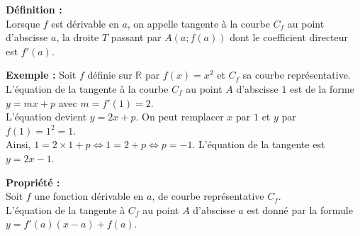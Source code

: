 \documentclass[11pt,a4paper]{article}
\begin{document}
\begin{mdframed}[style=definitionStyle]
    \textbf{Définition :} ~\\
    Lorsque $f$ est dérivable en $a$, on appelle tangente à la courbe $C_f$ au point d'abscisse $a$, la droite $T$ passant par $A(a;f(a))$ dont le coefficient directeur est $f'(a)$.
\end{mdframed}

\begin{minipage}{0.4\textwidth}
\end{minipage}
\hspace{0.05\textwidth}
\begin{minipage}{0.55\textwidth}
    \textbf{Exemple :} Soit $f$ définie sur $\mathbb{R}$ par $f(x)=x^2$ et $C_f$ sa courbe représentative. \\

    L'équation de la tangente à la courbe $C_f$ au point $A$ d'abscisse $1$ est de la forme $y=mx+p$ avec $m=f'(1)=2$. \\

    L'équation devient $y=2x+p$. On peut remplacer $x$ par $1$ et $y$ par $f(1)=1^2=1$. ~\\

    Ainsi, $1=2\times1+p\Leftrightarrow1=2+p\Leftrightarrow p=-1$.
    L'équation de la tangente est $y=2x-1$.
\end{minipage}

\begin{mdframed}[style=proprieteStyle]
    \textbf{Propriété :} ~\\
    Soit $f$ une fonction dérivable en $a$, de courbe représentative $C_f$. \\
    L'équation de la tangente à $C_f$ au point $A$ d'abscisse $a$ est donné par la formule $y=f'(a)(x-a)+f(a)$.
\end{mdframed}
\end{document}
